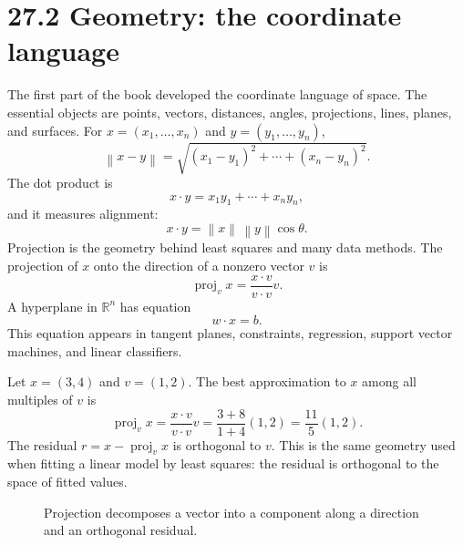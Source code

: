 \documentclass[11pt]{article}
\newcommand{\R}{\mathbb R}
\newcommand{\norm}[1]{\left\lVert #1\right\rVert}
\newcommand{\proj}{\operatorname{proj}}
\begin{document}
\section*{27.2 Geometry: the coordinate language}

The first part of the book developed the coordinate language of space. The essential objects are points, vectors, distances, angles, projections, lines, planes, and surfaces. For $x=(x_1,\ldots,x_n)$ and $y=(y_1,\ldots,y_n)$,
\[
\norm{x-y}=\sqrt{(x_1-y_1)^2+\cdots+(x_n-y_n)^2}.
\]
The dot product is
\[
x\cdot y=x_1y_1+\cdots+x_ny_n,
\]
and it measures alignment:
\[
x\cdot y=\norm{x}\,\norm{y}\cos\theta.
\]
Projection is the geometry behind least squares and many data methods. The projection of $x$ onto the direction of a nonzero vector $v$ is
\[
\proj_v x=\frac{x\cdot v}{v\cdot v}v.
\]
A hyperplane in $\R^n$ has equation
\[
w\cdot x=b.
\]
This equation appears in tangent planes, constraints, regression, support vector machines, and linear classifiers.

\begin{examplebox}
Let $x=(3,4)$ and $v=(1,2)$. The best approximation to $x$ among all multiples of $v$ is
\[
\proj_v x=\frac{x\cdot v}{v\cdot v}v=\frac{3+8}{1+4}(1,2)=\frac{11}{5}(1,2).
\]
The residual $r=x-\proj_v x$ is orthogonal to $v$. This is the same geometry used when fitting a linear model by least squares: the residual is orthogonal to the space of fitted values.
\end{examplebox}

\begin{figure}[H]
\centering
{}
\caption{Projection decomposes a vector into a component along a direction and an orthogonal residual.}
\end{figure}
\end{document}
